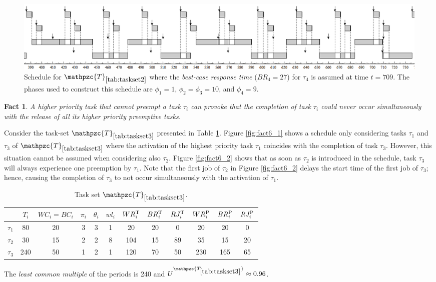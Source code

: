 \documentclass[fleqn]{article}
\newtheorem{fact}{Fact}
\begin{document}
\begin{figure}[H]
	\centering
	\includegraphics[width=1.1\linewidth]{figures/fact5_2}
	\caption{Schedule for $\mathpzc{T}_{\ref{tab:taskset2}}$ where the \textit{best-case response time} ($BR_4 = 27$) for $\tau_4$ is assumed at time $t=709$. The phases used to construct this schedule are $\phi_1 = 1$, $\phi_2 = \phi_3 = 10$, and $\phi_4 = 9$.}
	\label{fig:fact5_2}
\end{figure}

\begin{fact}
	A higher priority task that cannot preempt a task $\tau_i$ can provoke that the completion of task $\tau_i$ could never occur simultaneously with the release of all its higher priority preemptive tasks.
\end{fact}

Consider the task-set $\mathpzc{T}_{\ref{tab:taskset3}}$ presented in Table \ref{tab:taskset3}. Figure \ref{fig:fact6_1} shows a schedule only considering tasks $\tau_1$ and $\tau_3$  of $\mathpzc{T}_{\ref{tab:taskset3}}$ where the activation of the highest priority task $\tau_1$ coincides with the completion of task $\tau_3$. However, this situation cannot be assumed when considering also $\tau_2$. Figure \ref{fig:fact6_2} shows that as soon as $\tau_2$ is introduced in the schedule, task $\tau_3$ will always experience one preemption by $\tau_1$. Note that the first job of $\tau_2$ in Figure \ref{fig:fact6_2} delays the start time of the first job of $\tau_3$; hence, causing the completion of $\tau_3$ to not occur simultaneously with the activation of $\tau_1$.

\begin{table}[H]
	\center
	\caption{Task set $\mathpzc{T}_{\ref{tab:taskset3}}$.}
	\label{tab:taskset3}
	\begin{tabular}{c c c c c | c c c c c c c}
		\hline 
		& $T_i$ & $WC_i=BC_i$ & $\pi_i$ & $\theta_i$ &  $wl_i$ & $WR^{\rm T}_i$ & $BR^{\rm T}_i$ & $RJ^{\rm T}_i$ &  $WR^{\rm P}_i$ & $BR^{\rm P}_i$ & $RJ^{\rm P}_i$\\ 
		\hline 
		$\tau_1$& 80  & 20  & 3 & 3 &  1 & 20 & 20  & 0  & 20  & 20  & 0\\ 
		$\tau_2$& 30  & 15  & 2 & 2 &  8 & 104 & 15 & 89 & 35  & 15  & 20\\ 
		$\tau_3$& 240 & 50  & 1 & 2 &  1 & 120 & 70 & 50 & 230 & 165 & 65\\ 
		\hline 
	\end{tabular}

	\small
	\item The \textit{least common multiple} of the periods is 240 and $U^{\mathpzc{T_{\ref{tab:taskset3}}}} \approx 0.96$.
\end{table} 
\end{document}
